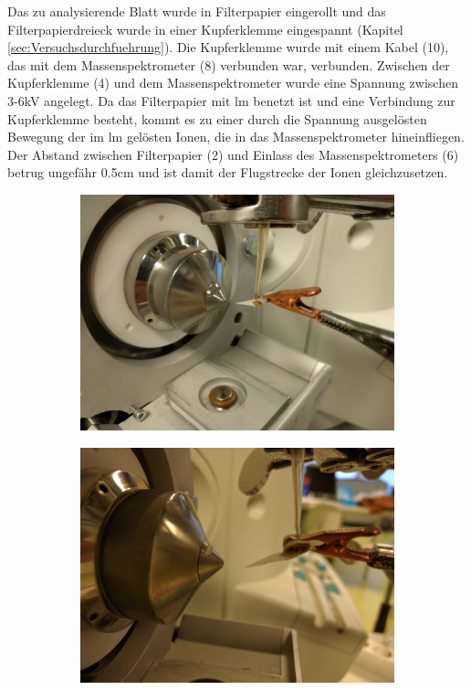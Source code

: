 Das zu analysierende Blatt wurde in Filterpapier eingerollt und das Filterpapierdreieck wurde in einer Kupferklemme eingespannt (Kapitel \ref{sec:Versuchsdurchfuehrung}). Die Kupferklemme wurde mit einem Kabel (10), das mit dem Massenspektrometer (8) verbunden war, verbunden. Zwischen der Kupferklemme (4) und dem Massenspektrometer wurde eine Spannung zwischen 3-6kV angelegt. Da das Filterpapier mit \gls{lm} benetzt ist und eine Verbindung zur Kupferklemme besteht, kommt es zu einer durch die Spannung ausgelösten Bewegung der im \gls{lm} gelösten Ionen, die in das Massenspektrometer hineinfliegen. Der Abstand zwischen Filterpapier (2) und Einlass des Massenspektrometers (6) betrug ungefähr 0.5cm und ist damit der Flugstrecke der Ionen gleichzusetzen. 

\begin{figure}[htbp]
  \begin{subfigure}[b]{0.5\textwidth}
    \includegraphics[width=\textwidth]{figures/Kapitel4/VWA_MSLeafspray_Detail1.jpg}
    \caption{}
    \label{fig:MSLeafsprayDetail1}
  \end{subfigure}
  \hfill
  \begin{subfigure}[b]{0.5\textwidth}
    \includegraphics[width=\textwidth]{figures/Kapitel4/VWA_MSLeafspray_Detail2.jpg}

\end{subfigure}
\end{figure}
